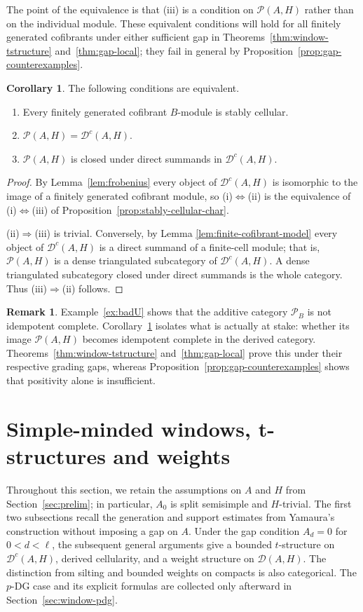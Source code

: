 \documentclass[11pt]{article}
\theoremstyle{definition}
\newtheorem{cor}[thm]{Corollary}
\newtheorem{rem}[thm]{Remark}
\numberwithin{equation}{section}
\newcommand{\Pun}{\mathcal{P}_B}
\newcommand{\Tcat}{\mathcal{P}(A,H)}
\newcommand{\Dc}{\mathcal{D}^c(A,H)}
\newcommand{\Der}{\mathcal{D}}
\begin{document}
The point of the equivalence is that (iii) is a condition on $\Tcat$ rather
than on the individual module. These equivalent conditions will hold for all finitely generated
cofibrants under either sufficient gap in Theorems~\ref{thm:window-tstructure} and~\ref{thm:gap-local}; they fail in
general by Proposition~\ref{prop:gap-counterexamples}.

\begin{cor}\label{cor:reformulation}
The following conditions are equivalent.
\begin{enumerate}
\item[(i)] Every finitely generated cofibrant $B$-module is stably cellular.
\item[(ii)] $\Tcat=\Dc$.
\item[(iii)] $\Tcat$ is closed under direct summands in $\Dc$.
\end{enumerate}
\end{cor}

\begin{proof}
By Lemma~\ref{lem:frobenius} every object of $\Dc$ is isomorphic to the image
of a finitely generated cofibrant module, so
(i)$\Leftrightarrow$(ii) is the equivalence of
(i)$\Leftrightarrow$(iii) of Proposition~\ref{prop:stably-cellular-char}.

(ii)$\Rightarrow$(iii) is trivial.  Conversely, by
Lemma \ref{lem:finite-cofibrant-model} every object of $\Dc$ is a direct
summand of a finite-cell module; that is, $\Tcat$ is a dense
triangulated subcategory of $\Dc$.  A dense triangulated subcategory closed
under direct summands is the whole category. Thus (iii)$\Rightarrow$(ii) follows.
\end{proof}

\begin{rem}\label{rem:Fimageclosed}
Example~\ref{ex:badU} shows that the additive category $\Pun$ is not
idempotent complete.  Corollary~\ref{cor:reformulation} isolates what is
actually at stake: whether its image $\Tcat$ becomes idempotent complete in
the derived category.  Theorems~\ref{thm:window-tstructure} and~\ref{thm:gap-local} prove this under their respective grading gaps, whereas
Proposition~\ref{prop:gap-counterexamples} shows that positivity alone
is insufficient.
\end{rem}



\section{Simple-minded windows, t-structures and weights}
\label{sec:yamaura}
Throughout this section, we retain the assumptions on $A$ and $H$ from
Section~\ref{sec:prelim}; in particular, $A_0$ is split semisimple and
$H$-trivial.   The first two subsections recall the generation and support
estimates from Yamaura's construction without imposing a gap on $A$.
Under the gap condition $A_d=0$ for $0<d<\ell$, the subsequent general
arguments give a bounded $t$-structure on $\Dc$, derived cellularity,
and a weight structure on $\Der(A,H)$.  The distinction from silting and
bounded weights on compacts is also categorical.  The $p$-DG case and
its explicit formulas are collected only afterward in
Section~\ref{sec:window-pdg}.
\end{document}
